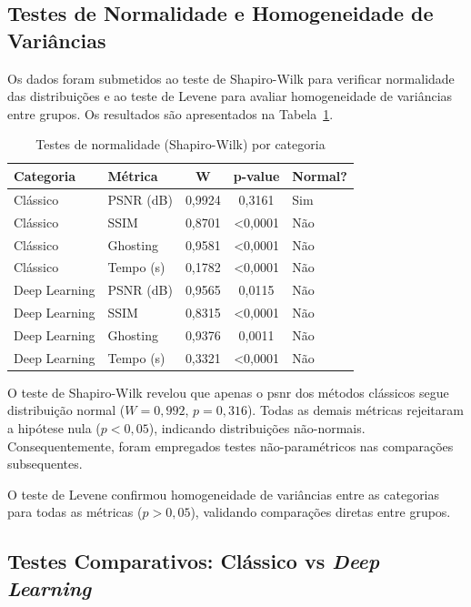 \subsection{Testes de Normalidade e Homogeneidade de Variâncias}

Os dados foram submetidos ao teste de Shapiro-Wilk para verificar normalidade das distribuições e ao teste de Levene para avaliar homogeneidade de variâncias entre grupos. Os resultados são apresentados na Tabela~\ref{tab:normalidade}.

\begin{table}[htb]
\centering
\caption{Testes de normalidade (Shapiro-Wilk) por categoria}
\label{tab:normalidade}
\small
\begin{tabular}{llccl}
\hline
\textbf{Categoria} & \textbf{Métrica} & \textbf{W} & \textbf{p-value} & \textbf{Normal?} \\ \hline
Clássico & PSNR (dB) & 0,9924 & 0,3161 & Sim \\
Clássico & SSIM & 0,8701 & <0,0001 & Não \\
Clássico & Ghosting & 0,9581 & <0,0001 & Não \\
Clássico & Tempo (s) & 0,1782 & <0,0001 & Não \\
Deep Learning & PSNR (dB) & 0,9565 & 0,0115 & Não \\
Deep Learning & SSIM & 0,8315 & <0,0001 & Não \\
Deep Learning & Ghosting & 0,9376 & 0,0011 & Não \\
Deep Learning & Tempo (s) & 0,3321 & <0,0001 & Não \\
\hline
\end{tabular}
\end{table}

O teste de Shapiro-Wilk revelou que apenas o \gls{psnr} dos métodos clássicos segue distribuição normal ($W=0{,}992$, $p=0{,}316$). Todas as demais métricas rejeitaram a hipótese nula ($p<0{,}05$), indicando distribuições não-normais. Consequentemente, foram empregados testes não-paramétricos nas comparações subsequentes.

O teste de Levene confirmou homogeneidade de variâncias entre as categorias para todas as métricas ($p>0{,}05$), validando comparações diretas entre grupos.

\subsection{Testes Comparativos: Clássico vs \textit{Deep Learning}}

